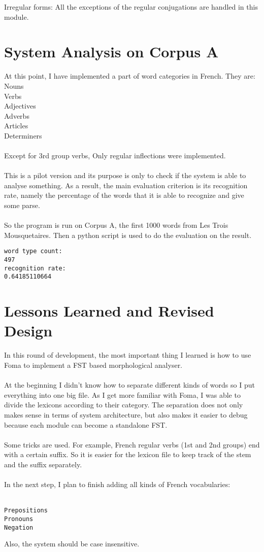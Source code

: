 \documentclass[11pt,letterpaper]{article}
\begin{document}
\indent Irregular forms: All the exceptions of the regular conjugations are handled in this module.\\
\section{System Analysis on Corpus A}
At this point, I have implemented a part of word categories in French. They are:\\
\indent Nouns\\
\indent Verbs\\
\indent Adjectives\\
\indent Adverbs\\
\indent Articles\\
\indent Determiners\\
\\
Except for 3rd group verbs, Only regular inflections were implemented.\\
\\
This is a pilot version and its purpose is only to check if the system is able to analyse something. As a result, the main evaluation criterion is its recognition rate, namely the percentage of the words that it is able to recognize and give some parse.\\
\\
So the program is run on Corpus A, the first 1000 words from Les Trois Mousquetaires. Then a python script is used to do the evaluation on the result.
\\
\begin{verbatim}
word type count:
497
recognition rate:
0.64185110664
\end{verbatim}

\section{Lessons Learned and Revised Design}
In this round of development, the most important thing I learned is how to use Foma to implement a FST based morphological analyser. \\
\\
At the beginning I didn't know how to separate different kinds of words so I put everything into one big file. As I get more familiar with Foma, I was able to divide the lexicons according to their category. The separation does not only makes sense in terms of system architecture, but also makes it easier to debug because each module can become a standalone FST.\\
\\
Some tricks are used. For example, French regular verbs (1st and 2nd groups) end with a certain suffix. So it is easier for the lexicon file to keep track of the stem and the suffix separately.\\
\\
In the next step, I plan to finish adding all kinds of French vocabularies:\\
\\
\begin{verbatim}
Prepositions
Pronouns
Negation
\end{verbatim}
Also, the system should be case insensitive.\\
\end{document}
